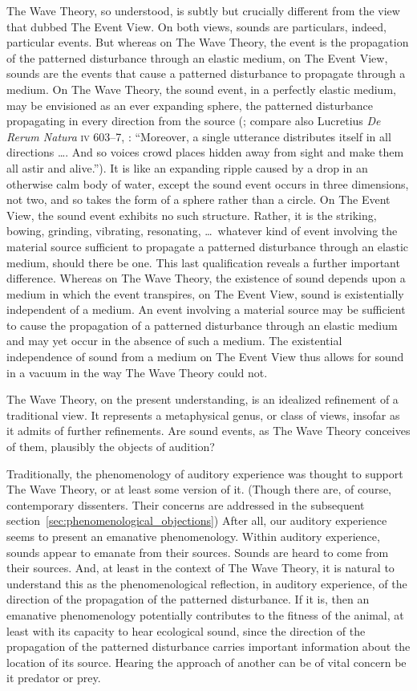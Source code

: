 The Wave Theory, so understood, is subtly but crucially different from the view that \citet{OCallaghan:2007xy} dubbed The Event View. On both views, sounds are particulars, indeed, particular events. But whereas on The Wave Theory, the event is the propagation of the patterned disturbance through an elastic medium, on The Event View, sounds are the events that cause a patterned disturbance to propagate through a medium. On The Wave Theory, the sound event, in a perfectly elastic medium, may be envisioned as an ever expanding sphere, the patterned disturbance propagating in every direction from the source (\citealt{Sorensen:2009aa}; compare also Lucretius \emph{De Rerum Natura} \textsc{iv} 603--7, \citealt{Smith:2001aa}: ``Moreover, a single utterance distributes itself in all directions \ldots. And so voices crowd places hidden away from sight and make them all astir and alive.''). It is like an expanding ripple caused by a drop in an otherwise calm body of water, except the sound event occurs in three dimensions, not two, and so takes the form of a sphere rather than a circle. On The Event View, the sound event exhibits no such structure. Rather, it is the striking, bowing, grinding, vibrating, resonating, \ldots\ whatever kind of event involving the material source sufficient to propagate a patterned disturbance through an elastic medium, should there be one. This last qualification reveals a further important difference. Whereas on The Wave Theory, the existence of sound depends upon a medium in which the event transpires, on The Event View, sound is existentially independent of a medium. An event involving a material source may be sufficient to cause the propagation of a patterned disturbance through an elastic medium and may yet occur in the absence of such a medium. The existential independence of sound from a medium on The Event View thus allows for sound in a vacuum in the way The Wave Theory could not.

The Wave Theory, on the present understanding, is an idealized refinement of a traditional view. It represents a metaphysical genus, or class of views, insofar as it admits of further refinements. Are sound events, as The Wave Theory conceives of them, plausibly the objects of audition?

Traditionally, the phenomenology of auditory experience was thought to support The Wave Theory, or at least some version of it. (Though there are, of course, contemporary dissenters. Their concerns are addressed in the subsequent section~\ref{sec:phenomenological_objections}) After all, our auditory experience seems to present an emanative phenomenology. Within auditory experience, sounds appear to emanate from their sources. Sounds are heard to come from their sources. And, at least in the context of The Wave Theory, it is natural to understand this as the phenomenological reflection, in auditory experience, of the direction of the propagation of the patterned disturbance. If it is, then an emanative phenomenology potentially contributes to the fitness of the animal, at least with its capacity to hear ecological sound, since the direction of the propagation of the patterned disturbance carries important information about the location of its source. Hearing the approach of another can be of vital concern be it predator or prey.

